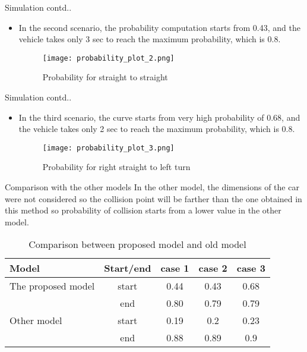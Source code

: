 \documentclass{beamer}
\begin{document}
\begin{frame}{Simulation contd..}
    \begin{itemize}
       \item In the second scenario, the probability computation starts from 0.43,  and the vehicle takes only 3 sec to reach the maximum probability, which is 0.8.
       \begin{figure}
            \centering
            \texttt{[image: probability\_plot\_2.png]}
            \caption{Probability for straight to straight}
            \label{probability_plot_2}
        \end{figure}
   \end{itemize}
\end{frame}
\begin{frame}{Simulation contd..}
    \begin{itemize}
       \item In the third scenario, the curve starts from very high probability of 0.68,  and the vehicle takes only 2 sec to reach the maximum probability, which is 0.8.
       \begin{figure}
            \centering
            \texttt{[image: probability\_plot\_3.png]}
            \caption{Probability for right straight to left turn}
            \label{probability_plot_3}
        \end{figure}
   \end{itemize}
\end{frame}
\begin{frame}{Comparison with the other models}
    In the other model, the dimensions of the car were not considered so the collision point will be farther than the one obtained in this method so probability of collision starts from a lower value in the other model.
    \begin{table}
    \begin{tabular}{|l|*{4}{c|}}\hline
    Model&Start/end&{case 1}&{case 2}&{case 3}\\\hline
    The proposed model & start & 0.44 & 0.43 & 0.68\\
                       & end   & 0.80 & 0.79 & 0.79\\\hline
    Other model & start & 0.19 & 0.2 & 0.23\\
                   & end   & 0.88 & 0.89 & 0.9\\\hline
    \end{tabular}
    \caption{Comparison between proposed model and old model}
    \end{table}  
\end{frame}
\end{document}
